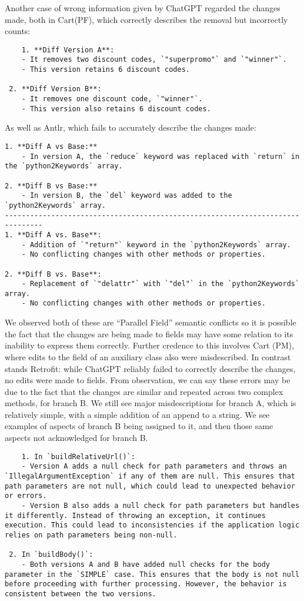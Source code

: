 Another case of wrong information given by ChatGPT regarded the changes made, both in Cart(PF), which 
correctly describes the removal but incorrectly counts:
\begin{lstlisting}
    1. **Diff Version A**:
    - It removes two discount codes, `"superpromo"` and `"winner"`.
    - This version retains 6 discount codes.
 
 2. **Diff Version B**:
    - It removes one discount code, `"winner"`.
    - This version also retains 6 discount codes.
\end{lstlisting}
As well as Antlr, which fails to accurately describe the changes made:
\begin{lstlisting}
1. **Diff A vs Base:**
    - In version A, the `reduce` keyword was replaced with `return` in the `python2Keywords` array.
 
2. **Diff B vs Base:**
    - In version B, the `del` keyword was added to the `python2Keywords` array.
-------------------------------------------------------------------------------
1. **Diff A vs. Base**:
    - Addition of `"return"` keyword in the `python2Keywords` array.
    - No conflicting changes with other methods or properties.
 
2. **Diff B vs. Base**:
    - Replacement of `"delattr"` with `"del"` in the `python2Keywords` array.
    - No conflicting changes with other methods or properties.
\end{lstlisting}
We observed both of these are ``Parallel Field'' semantic conflicts so it is possible the fact that the changes are being made to fields may have some relation to its inability to express them correctly. 
Further credence to this involves Cart (PM), where edits to the field of an auxiliary class also were misdescribed.
In contrast stands Retrofit: while ChatGPT reliably failed to correctly describe the changes, no edits were made to fields. From observation, we can say these errors may be due
to the fact that the changes are similar and repeated across two complex methods, for branch B. We still see major misdescriptions for branch A, which is relatively simple, with a simple addition of an append to a string.
We see examples of aspects of branch B being assigned to it, and then those same aspects not acknowledged for branch B.
\begin{lstlisting}
    1. In `buildRelativeUrl()`:
    - Version A adds a null check for path parameters and throws an `IllegalArgumentException` if any of them are null. This ensures that path parameters are not null, which could lead to unexpected behavior or errors.
    - Version B also adds a null check for path parameters but handles it differently. Instead of throwing an exception, it continues execution. This could lead to inconsistencies if the application logic relies on path parameters being non-null.
 
 2. In `buildBody()`:
    - Both versions A and B have added null checks for the body parameter in the `SIMPLE` case. This ensures that the body is not null before proceeding with further processing. However, the behavior is consistent between the two versions. 
\end{lstlisting}

